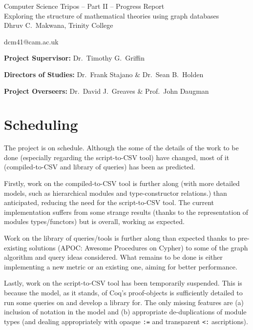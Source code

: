 \documentclass[12pt,a4paper]{article}
\begin{document}
\begin{center}
\Large
Computer Science Tripos -- Part II -- Progress Report\\[4mm]
\LARGE
Exploring the structure of mathematical theories using graph databases\\[4mm]

\large
Dhruv C.~Makwana, Trinity College

dcm41@cam.ac.uk

\end{center}

\vspace{5mm}

\textbf{Project Supervisor:} Dr.~Timothy G.~Griffin

\textbf{Directors of Studies:} Dr.~Frank Stajano \& Dr.~Sean B.~Holden

\textbf{Project Overseers:} Dr.~David J.~Greaves  \& Prof.~John Daugman

\section*{Scheduling}

The project is on schedule. Although the some of the details of the work to be
done (especially regarding the script-to-CSV tool) have changed, most of it
(compiled-to-CSV and library of queries) has been as predicted.

Firstly, work on the compiled-to-CSV tool is further along (with more detailed
models, such as hierarchical modules and type-constructor relations.) than
anticipated, reducing the need for the script-to-CSV tool. The current
implementation suffers from some strange results (thanks to the representation
of modules types/functors) but is overall, working as expected.

Work on the library of queries/tools is further along than expected thanks to
pre-existing solutions (APOC: Awesome Procedures on Cypher) to some of the
graph algorithm and query ideas considered. What remains to be done is either
implementing a new metric or an existing one, aiming for better performance.

Lastly, work on the script-to-CSV tool has been temporarily suspended. This is
because the model, as it stands, of Coq's proof-objects is sufficiently detailed
to run some queries on and develop a library for. The only missing features are
(a) inclusion of notation in the model and (b) appropriate de-duplications of
module types (and dealing appropriately with opaque \texttt{:=} and
transparent \texttt{<:} ascriptions).
\end{document}
